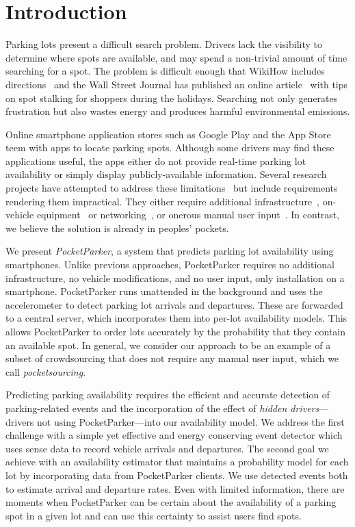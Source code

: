 \section{Introduction}


Parking lots present a difficult search problem. Drivers lack the visibility
to determine where spots are available, and may spend a non-trivial amount of
time searching for a spot. The problem is difficult enough that WikiHow
includes directions~\cite{wikihow-park} and the Wall Street Journal has
published an online article~\cite{wsj-park} with tips on spot stalking for
shoppers during the holidays. Searching not only generates frustration but
also wastes energy and produces harmful environmental emissions.

Online smartphone application stores such as Google Play and the App Store
teem with apps to locate parking spots. Although some drivers may find these
applications useful, the apps either do not provide real-time parking lot
availability or simply display publicly-available information. Several
research projects have attempted to address these limitations~\cite{4212497,
Chen:2012:COS, Delot:2009:CRP, 5062057, Mathur:2010:PDS} but include
requirements rendering them impractical.  They either require additional
infrastructure~\cite{5062057}, on-vehicle equipment~\cite{Mathur:2010:PDS}
or networking~\cite{Delot:2009:CRP, Mathur:2010:PDS}, or onerous manual user
input~\cite{Chen:2012:COS}. In contrast, we believe the solution is already
in peoples' pockets.

We present \textit{PocketParker}, a system that predicts parking lot
availability using smartphones. Unlike previous approaches, PocketParker
requires no additional infrastructure, no vehicle modifications, and no user
input, only installation on a smartphone.  PocketParker runs unattended in
the background and uses the accelerometer to detect parking lot
arrivals and departures.  These are forwarded to a central server, which
incorporates them into per-lot availability models.  This allows PocketParker
to order lots accurately by the probability that they contain an available
spot.  In general, we consider our approach to be an example of a subset of
crowdsourcing that does not require any manual user input, which we call
\textit{pocketsourcing}.

Predicting parking availability requires the efficient and accurate detection
of parking-related events and the incorporation of the effect of
\textit{hidden drivers}---drivers not using PocketParker---into our
availability model. We address the first challenge with a simple yet effective
and energy conserving event detector which uses sense data to record vehicle
arrivals and departures.  The second goal we achieve with an availability
estimator that maintains a probability model for each lot by incorporating
data from PocketParker clients. We use detected events both to estimate
arrival and departure rates.  Even with limited information, there are moments
when PocketParker can be certain about the availability of a parking spot in a
given lot and can use this certainty to assist users find spots.

